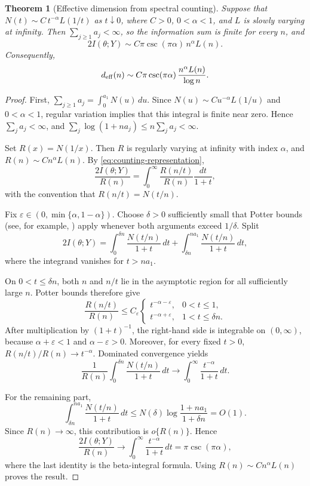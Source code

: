 \documentclass[11pt]{article}
\theoremstyle{plain}
\newtheorem{theorem}{Theorem}
\theoremstyle{definition}
\theoremstyle{remark}
\begin{document}
\begin{theorem}[Effective dimension from spectral counting]
	\label{thm:counting-function}
	Suppose that \(N(t)\sim C\,t^{-\alpha}L(1/t)\) as \(t\downarrow0\), where \(C>0\), \(0<\alpha<1\), and \(L\) is slowly varying at infinity. Then \(\sum_{j\geq1}a_j<\infty\), so the information sum is finite for every \(n\), and
	\[
	2I(\theta;Y)\sim C\pi\csc(\pi\alpha)\,n^\alpha L(n).
	\]
	Consequently,
	\[
	d_{\rm eff}(n)\sim C\pi\csc(\pi\alpha)\,\frac{n^\alpha L(n)}{\log n}.
	\]
\end{theorem}

\begin{proof}
	First, \(\sum_{j\geq1}a_j=\int_0^{a_1}N(u)\,du\). Since \(N(u)\sim Cu^{-\alpha}L(1/u)\) and \(0<\alpha<1\), regular variation implies that this integral is finite near zero. Hence \(\sum_j a_j<\infty\), and \(\sum_j\log(1+na_j)\leq n\sum_j a_j<\infty\).
	
	Set \(R(x)=N(1/x)\). Then \(R\) is regularly varying at infinity with index \(\alpha\), and \(R(n)\sim Cn^\alpha L(n)\). By \eqref{eq:counting-representation},
	\[
	\frac{2I(\theta;Y)}{R(n)}
	=
	\int_0^\infty
	\frac{R(n/t)}{R(n)}
	\frac{dt}{1+t},
	\]
	with the convention that \(R(n/t)=N(t/n)\).
	
	Fix \(\varepsilon\in(0,\min\{\alpha,1-\alpha\})\). Choose \(\delta>0\) sufficiently small that Potter bounds (see, for example, \cite{bingham1987regular}) apply whenever both arguments exceed \(1/\delta\). Split
	\[
	2I(\theta;Y)
	=
	\int_0^{\delta n}\frac{N(t/n)}{1+t}\,dt
	+
	\int_{\delta n}^{na_1}\frac{N(t/n)}{1+t}\,dt,
	\]
	where the integrand vanishes for \(t>na_1\).
	
	On \(0<t\leq\delta n\), both \(n\) and \(n/t\) lie in the asymptotic region for all sufficiently large \(n\). Potter bounds therefore give
	\[
	\frac{R(n/t)}{R(n)}
	\leq
	C_\varepsilon
	\begin{cases}
		t^{-\alpha-\varepsilon}, & 0<t\leq1,\\[1mm]
		t^{-\alpha+\varepsilon}, & 1<t\leq\delta n.
	\end{cases}
	\]
	After multiplication by \((1+t)^{-1}\), the right-hand side is integrable on \((0,\infty)\), because \(\alpha+\varepsilon<1\) and \(\alpha-\varepsilon>0\). Moreover, for every fixed \(t>0\), \(R(n/t)/R(n)\to t^{-\alpha}\). Dominated convergence yields
	\[
	\frac{1}{R(n)}
	\int_0^{\delta n}\frac{N(t/n)}{1+t}\,dt
	\longrightarrow
	\int_0^\infty\frac{t^{-\alpha}}{1+t}\,dt.
	\]
	
	For the remaining part,
	\[
	\int_{\delta n}^{na_1}\frac{N(t/n)}{1+t}\,dt
	\leq
	N(\delta)\log\frac{1+na_1}{1+\delta n}
	=
	O(1).
	\]
	Since \(R(n)\to\infty\), this contribution is \(o\{R(n)\}\). Hence
	\[
	\frac{2I(\theta;Y)}{R(n)}
	\longrightarrow
	\int_0^\infty\frac{t^{-\alpha}}{1+t}\,dt
	=
	\pi\csc(\pi\alpha),
	\]
	where the last identity is the beta-integral formula. Using \(R(n)\sim Cn^\alpha L(n)\) proves the result.
\end{proof}
\end{document}
